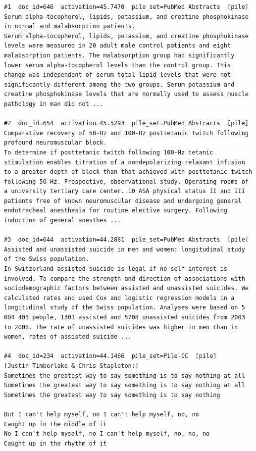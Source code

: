 \begin{verbatim}
#1  doc_id=646  activation=45.7470  pile_set=PubMed Abstracts  [pile]
Serum alpha-tocopherol, lipids, potassium, and creatine phosphokinase in normal and malabsorption patients.
Serum alpha-tocopherol, lipids, potassium, and creatine phosphokinase levels were measured in 20 adult male control patients and eight malabsorption patients. The malabsorption group had significantly lower serum alpha-tocopherol levels than the control group. This change was independent of serum total lipid levels that were not significantly different among the two groups. Serum potassium and creatine phosphokinase levels that are normally used to assess muscle pathology in man did not ...

#2  doc_id=654  activation=45.5293  pile_set=PubMed Abstracts  [pile]
Comparative recovery of 50-Hz and 100-Hz posttetanic twitch following profound neuromuscular block.
To determine if posttetanic twitch following 100-Hz tetanic stimulation enables titration of a nondepolarizing relaxant infusion to a greater depth of block than that achieved with posttetanic twitch following 50 Hz. Prospective, observational study. Operating rooms of a university tertiary care center. 10 ASA physical status II and III patients free of known neuromuscular disease and undergoing general endotracheal anesthesia for routine elective surgery. Following induction of general anesthes ...

#3  doc_id=644  activation=44.2881  pile_set=PubMed Abstracts  [pile]
Assisted and unassisted suicide in men and women: longitudinal study of the Swiss population.
In Switzerland assisted suicide is legal if no self-interest is involved. To compare the strength and direction of associations with sociodemographic factors between assisted and unassisted suicides. We calculated rates and used Cox and logistic regression models in a longitudinal study of the Swiss population. Analyses were based on 5 004 403 people, 1301 assisted and 5708 unassisted suicides from 2003 to 2008. The rate of unassisted suicides was higher in men than in women, rates of assisted suicide ...

#4  doc_id=234  activation=44.1466  pile_set=Pile-CC  [pile]
[Justin Timberlake & Chris Stapleton:]
Sometimes the greatest way to say something is to say nothing at all
Sometimes the greatest way to say something is to say nothing at all
Sometimes the greatest way to say something is to say nothing

But I can't help myself, no I can't help myself, no, no
Caught up in the middle of it
No I can't help myself, no I can't help myself, no, no, no
Caught up in the rhythm of it


\end{verbatim}

